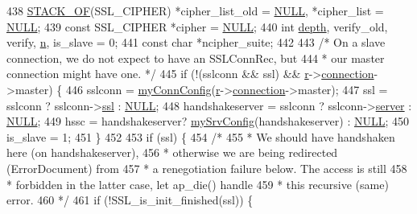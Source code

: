 \begin{DoxyCode}
438     \hyperlink{ssl__engine__init_8c_a8d3ef5dbf93a046b44c0a610b5325b45}{STACK\_OF}(SSL\_CIPHER) *cipher\_list\_old = \hyperlink{pcre_8txt_ad7f989d16aa8ca809a36bc392c07fba1}{NULL}, *cipher\_list = 
      \hyperlink{pcre_8txt_ad7f989d16aa8ca809a36bc392c07fba1}{NULL};
439     \textcolor{keyword}{const} SSL\_CIPHER *cipher = \hyperlink{pcre_8txt_ad7f989d16aa8ca809a36bc392c07fba1}{NULL};
440     \textcolor{keywordtype}{int} \hyperlink{group__MOD__DAV_ga1e39589253388daddc3eade7e70744e5}{depth}, verify\_old, verify, \hyperlink{group__APACHE__CORE__PROTO_gad484edfd58b9127caa8f0f59b4004d09}{n}, is\_slave = 0;
441     \textcolor{keyword}{const} \textcolor{keywordtype}{char} *ncipher\_suite;
442 
443     \textcolor{comment}{/* On a slave connection, we do not expect to have an SSLConnRec, but}
444 \textcolor{comment}{     * our master connection might have one. */}
445     \textcolor{keywordflow}{if} (!(sslconn && ssl) && \hyperlink{group__APACHE__CORE__CONFIG_ga091cdd45984e865a888a4f8bb8fe107a}{r}->\hyperlink{structrequest__rec_a0924aae55826638314f76952ca5d60b1}{connection}->master) \{
446         sslconn         = \hyperlink{group__MOD__SSL__PRIVATE_ga8a3e05c43e4243e56d3f1f6ee3f2d579}{myConnConfig}(\hyperlink{group__APACHE__CORE__CONFIG_ga091cdd45984e865a888a4f8bb8fe107a}{r}->\hyperlink{structrequest__rec_a0924aae55826638314f76952ca5d60b1}{connection}->master);
447         ssl             = sslconn ? sslconn->\hyperlink{structSSLConnRec_acc0257b6ed74d7c6aee8f1a3447df6b5}{ssl} : \hyperlink{pcre_8txt_ad7f989d16aa8ca809a36bc392c07fba1}{NULL};
448         handshakeserver = sslconn ? sslconn->\hyperlink{structSSLConnRec_aae4b90a2b0affa02e0b081f167052bb9}{server} : \hyperlink{pcre_8txt_ad7f989d16aa8ca809a36bc392c07fba1}{NULL};
449         hssc            = handshakeserver? \hyperlink{group__MOD__SSL__PRIVATE_ga3ea8e2c288a4f4af189ae0fc4f1fd996}{mySrvConfig}(handshakeserver) : 
      \hyperlink{pcre_8txt_ad7f989d16aa8ca809a36bc392c07fba1}{NULL};
450         is\_slave        = 1;
451     \}
452     
453     \textcolor{keywordflow}{if} (ssl) \{
454         \textcolor{comment}{/*}
455 \textcolor{comment}{         * We should have handshaken here (on handshakeserver),}
456 \textcolor{comment}{         * otherwise we are being redirected (ErrorDocument) from}
457 \textcolor{comment}{         * a renegotiation failure below. The access is still }
458 \textcolor{comment}{         * forbidden in the latter case, let ap\_die() handle}
459 \textcolor{comment}{         * this recursive (same) error.}
460 \textcolor{comment}{         */}
461         \textcolor{keywordflow}{if} (!SSL\_is\_init\_finished(ssl)) \{

\end{DoxyCode}
